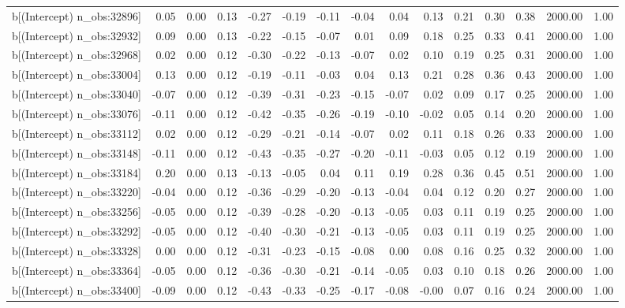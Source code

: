 \begin{table}[ht]
\begin{tabular}{rrrrrrrrrrrrrrr}
  b[(Intercept) n\_obs:32896] & 0.05 & 0.00 & 0.13 & -0.27 & -0.19 & -0.11 & -0.04 & 0.04 & 0.13 & 0.21 & 0.30 & 0.38 & 2000.00 & 1.00 \\ 
  b[(Intercept) n\_obs:32932] & 0.09 & 0.00 & 0.13 & -0.22 & -0.15 & -0.07 & 0.01 & 0.09 & 0.18 & 0.25 & 0.33 & 0.41 & 2000.00 & 1.00 \\ 
  b[(Intercept) n\_obs:32968] & 0.02 & 0.00 & 0.12 & -0.30 & -0.22 & -0.13 & -0.07 & 0.02 & 0.10 & 0.19 & 0.25 & 0.31 & 2000.00 & 1.00 \\ 
  b[(Intercept) n\_obs:33004] & 0.13 & 0.00 & 0.12 & -0.19 & -0.11 & -0.03 & 0.04 & 0.13 & 0.21 & 0.28 & 0.36 & 0.43 & 2000.00 & 1.00 \\ 
  b[(Intercept) n\_obs:33040] & -0.07 & 0.00 & 0.12 & -0.39 & -0.31 & -0.23 & -0.15 & -0.07 & 0.02 & 0.09 & 0.17 & 0.25 & 2000.00 & 1.00 \\ 
  b[(Intercept) n\_obs:33076] & -0.11 & 0.00 & 0.12 & -0.42 & -0.35 & -0.26 & -0.19 & -0.10 & -0.02 & 0.05 & 0.14 & 0.20 & 2000.00 & 1.00 \\ 
  b[(Intercept) n\_obs:33112] & 0.02 & 0.00 & 0.12 & -0.29 & -0.21 & -0.14 & -0.07 & 0.02 & 0.11 & 0.18 & 0.26 & 0.33 & 2000.00 & 1.00 \\ 
  b[(Intercept) n\_obs:33148] & -0.11 & 0.00 & 0.12 & -0.43 & -0.35 & -0.27 & -0.20 & -0.11 & -0.03 & 0.05 & 0.12 & 0.19 & 2000.00 & 1.00 \\ 
  b[(Intercept) n\_obs:33184] & 0.20 & 0.00 & 0.13 & -0.13 & -0.05 & 0.04 & 0.11 & 0.19 & 0.28 & 0.36 & 0.45 & 0.51 & 2000.00 & 1.00 \\ 
  b[(Intercept) n\_obs:33220] & -0.04 & 0.00 & 0.12 & -0.36 & -0.29 & -0.20 & -0.13 & -0.04 & 0.04 & 0.12 & 0.20 & 0.27 & 2000.00 & 1.00 \\ 
  b[(Intercept) n\_obs:33256] & -0.05 & 0.00 & 0.12 & -0.39 & -0.28 & -0.20 & -0.13 & -0.05 & 0.03 & 0.11 & 0.19 & 0.25 & 2000.00 & 1.00 \\ 
  b[(Intercept) n\_obs:33292] & -0.05 & 0.00 & 0.12 & -0.40 & -0.30 & -0.21 & -0.13 & -0.05 & 0.03 & 0.11 & 0.19 & 0.25 & 2000.00 & 1.00 \\ 
  b[(Intercept) n\_obs:33328] & 0.00 & 0.00 & 0.12 & -0.31 & -0.23 & -0.15 & -0.08 & 0.00 & 0.08 & 0.16 & 0.25 & 0.32 & 2000.00 & 1.00 \\ 
  b[(Intercept) n\_obs:33364] & -0.05 & 0.00 & 0.12 & -0.36 & -0.30 & -0.21 & -0.14 & -0.05 & 0.03 & 0.10 & 0.18 & 0.26 & 2000.00 & 1.00 \\ 
  b[(Intercept) n\_obs:33400] & -0.09 & 0.00 & 0.12 & -0.43 & -0.33 & -0.25 & -0.17 & -0.08 & -0.00 & 0.07 & 0.16 & 0.24 & 2000.00 & 1.00 \\ 

\end{tabular}
\end{table}
